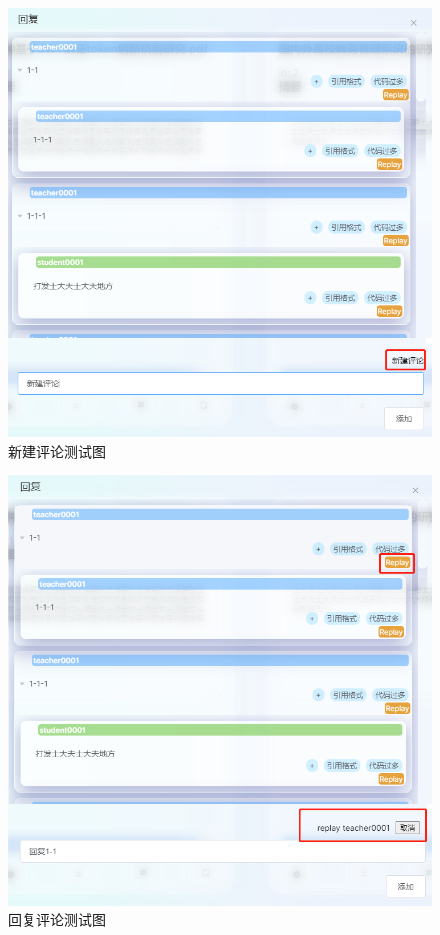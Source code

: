\begin{figure}
  \centering
  \includegraphics[scale = 0.6]{out/figure/测试/comment-add.png}
  \caption{\song\wuhao 新建评论测试图}
  \label{comment-add}
\end{figure}

\begin{figure}
  \centering
  \includegraphics[scale = 0.6]{out/figure/测试/comment-replay.png}
  \caption{\song\wuhao 回复评论测试图}
  \label{comment-replay}
\end{figure}

